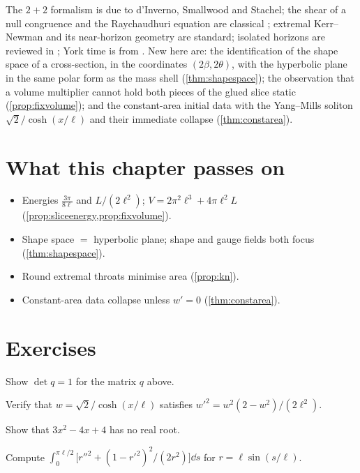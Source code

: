 \begin{litbox}
The $2+2$ formalism is due to d'Inverno, Smallwood and Stachel; the shear of a null congruence and the Raychaudhuri equation are classical \cite{HawkingEllis}; extremal Kerr--Newman and its near-horizon geometry are standard; isolated horizons are reviewed in \cite{AshtekarKrishnan2004}; York time is from \cite{York1972}. New here are: the identification of the shape space of a cross-section, in the coordinates $(2\beta,2\theta)$, with the hyperbolic plane in the same polar form as the mass shell (\cref{thm:shapespace}); the observation that a volume multiplier cannot hold both pieces of the glued slice static (\cref{prop:fixvolume}); and the constant-area initial data with the Yang--Mills soliton $\sqrt2/\cosh(x/\ell)$ and their immediate collapse (\cref{thm:constarea}).
\end{litbox}

\section*{What this chapter passes on}
\begin{itemize}[nosep]
\item Energies $\frac{3\pi}{8\ell}$ and $L/(2\ell^2)$; $V=2\pi^2\ell^3+4\pi\ell^2L$ (\cref{prop:sliceenergy,prop:fixvolume}).
\item Shape space $=$ hyperbolic plane; shape and gauge fields both focus (\cref{thm:shapespace}).
\item Round extremal throats minimise area (\cref{prop:kn}).
\item Constant-area data collapse unless $w'=0$ (\cref{thm:constarea}).
\end{itemize}

\section*{Exercises}
\begin{exercise}
Show $\det q=1$ for the matrix $q$ above.
\end{exercise}
\begin{exercise}
Verify that $w=\sqrt2/\cosh(x/\ell)$ satisfies $w'^2=w^2(2-w^2)/(2\ell^2)$.
\end{exercise}
\begin{exercise}
Show that $3x^2-4x+4$ has no real root.
\end{exercise}
\begin{exercise}
Compute $\int_0^{\pi\ell/2}\bigl[r''^2+(1-r'^2)^2/(2r^2)\bigr]\dd s$ for $r=\ell\sin(s/\ell)$.
\end{exercise}

